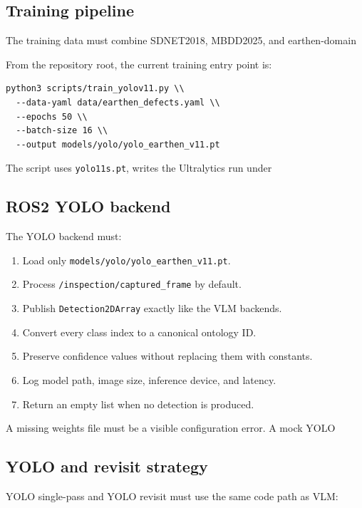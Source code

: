 \documentclass[11pt,a4paper]{article}
\newcommand{\code}[1]{\texttt{\small #1}}
\begin{document}
\subsection{Training pipeline}

The training data must combine SDNET2018, MBDD2025, and earthen-domain

From the repository root, the current training entry point is:

\begin{verbatim}
python3 scripts/train_yolov11.py \\
  --data-yaml data/earthen_defects.yaml \\
  --epochs 50 \\
  --batch-size 16 \\
  --output models/yolo/yolo_earthen_v11.pt
\end{verbatim}

The script uses \code{yolo11s.pt}, writes the Ultralytics run under

\subsection{ROS2 YOLO backend}

The YOLO backend must:

\begin{enumerate}[leftmargin=1.2cm]
\item Load only \code{models/yolo/yolo\_earthen\_v11.pt}.
\item Process \code{/inspection/captured\_frame} by default.
\item Publish \code{Detection2DArray} exactly like the VLM backends.
\item Convert every class index to a canonical ontology ID.
\item Preserve confidence values without replacing them with constants.
\item Log model path, image size, inference device, and latency.
\item Return an empty list when no detection is produced.
\end{enumerate}

A missing weights file must be a visible configuration error. A mock YOLO

\subsection{YOLO and revisit strategy}

YOLO single-pass and YOLO revisit must use the same code path as VLM:
\end{document}
